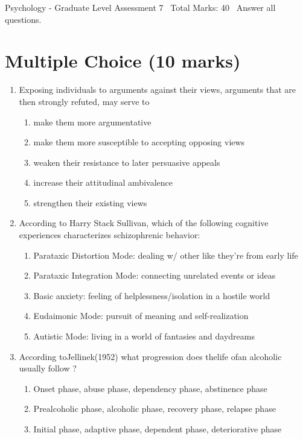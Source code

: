 \documentclass[12pt]{article}
\begin{document}
\begin{center}
Psychology - Graduate Level Assessment 7 \
Total Marks: 40 \
Answer all questions.
\end{center}

\section*{Multiple Choice (10 marks)}
\begin{enumerate}[label=\arabic*.]
\item Exposing individuals to arguments against their views, arguments that are then strongly refuted, may serve to
\begin{enumerate}[label=(\alph*)]
    \item make them more argumentative
    \item make them more susceptible to accepting opposing views
    \item weaken their resistance to later persuasive appeals
    \item increase their attitudinal ambivalence
    \item strengthen their existing views
\end{enumerate}
\item According to Harry Stack Sullivan, which of the following cognitive experiences characterizes schizophrenic behavior:
\begin{enumerate}[label=(\alph*)]
    \item Parataxic Distortion Mode: dealing w/ other like they're from early life
    \item Parataxic Integration Mode: connecting unrelated events or ideas
    \item Basic anxiety: feeling of helplessness/isolation in a hostile world
    \item Eudaimonic Mode: pursuit of meaning and self-realization
    \item Autistic Mode: living in a world of fantasies and daydreams
\end{enumerate}
\item According toJellinek(1952) what progression does thelife ofan alcoholic usually follow ?
\begin{enumerate}[label=(\alph*)]
    \item Onset phase, abuse phase, dependency phase, abstinence phase
    \item Prealcoholic phase, alcoholic phase, recovery phase, relapse phase
    \item Initial phase, adaptive phase, dependent phase, deteriorative phase

\end{enumerate}
\end{enumerate}
\end{document}
